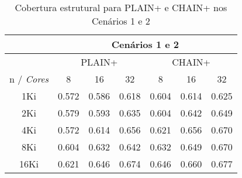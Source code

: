 \begin{table}[ht]
    \tiny
    \centering
    \caption{Cobertura estrutural para PLAIN+ e CHAIN+ nos Cenários 1 e 2\label{coverage-plus}}
    \begin{tabular}{c|ccc|ccc}
        \toprule
        & \multicolumn{6}{c}{Cenários 1 e 2} \\
        \midrule
             & \multicolumn{3}{c}{PLAIN+} & \multicolumn{3}{c}{CHAIN+} \\\midrule
        n / \textit{Cores}
             & 8     & 16    & 32         & 8     & 16    & 32         \\\midrule
        1Ki  & 0.572 & 0.586 & 0.618      & 0.604 & 0.614 & 0.625      \\\midrule
        2Ki  & 0.579 & 0.593 & 0.635      & 0.604 & 0.642 & 0.649      \\\midrule
        4Ki  & 0.572 & 0.614 & 0.656      & 0.621 & 0.656 & 0.670      \\\midrule
        8Ki  & 0.604 & 0.632 & 0.642      & 0.632 & 0.649 & 0.670      \\\midrule
        16Ki & 0.621 & 0.646 & 0.674      & 0.646 & 0.660 & 0.677      \\
        \bottomrule
    \end{tabular}
\end{table}
